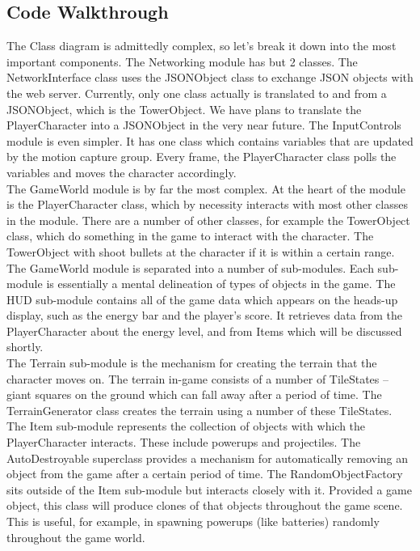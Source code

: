 \documentclass[10pt,letterpaper,oneside,english]{article}
\begin{document}
\subsection{Code Walkthrough}
The Class diagram is admittedly complex, so let’s break it down into the most important components. The Networking module has but 2 classes. The NetworkInterface class uses the JSONObject class to exchange JSON objects with the web server. Currently, only one class actually is translated to and from a JSONObject, which is the TowerObject. We have plans to translate the PlayerCharacter into a JSONObject in the very near future.
The InputControls module is even simpler. It has one class which contains variables that are updated by the motion capture group. Every frame, the PlayerCharacter class polls the variables and moves the character accordingly.\\
The GameWorld module is by far the most complex. At the heart of the module is the PlayerCharacter class, which by necessity interacts with most other classes in the module. There are a number of other classes, for example the TowerObject class, which do something in the game to interact with the character. The TowerObject with shoot bullets at the character if it is within a certain range.\\
The GameWorld module is separated into a number of sub-modules. Each sub-module is essentially a mental delineation of types of objects in the game. The HUD sub-module contains all of the game data which appears on the heads-up display, such as the energy bar and the player’s score. It retrieves data from the PlayerCharacter about the energy level, and from Items which will be discussed shortly.\\
The Terrain sub-module is the mechanism for creating the terrain that the character moves on. The terrain in-game consists of a number of TileStates -- giant squares on the ground which can fall away after a period of time. The TerrainGenerator class creates the terrain using a number of these TileStates.\\
The Item sub-module represents the collection of objects with which the PlayerCharacter interacts. These include powerups and projectiles. The AutoDestroyable superclass provides a mechanism for automatically removing an object from the game after a certain period of time. The RandomObjectFactory sits outside of the Item sub-module but interacts closely with it. Provided a game object, this class will produce clones of that objects throughout the game scene. This is useful, for example, in spawning powerups (like batteries) randomly throughout the game world.
\end{document}
